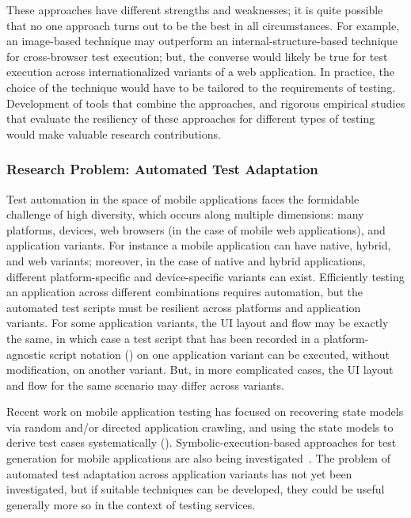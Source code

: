 These approaches have different strengths and weaknesses; it is quite possible
that no one approach turns out to be the best in all circumstances. For example,
an image-based technique may outperform an internal-structure-based technique
for cross-browser test execution; but, the converse would likely be true for
test execution across internationalized variants of a web application. In
practice, the choice of the technique would have to be tailored to the
requirements of testing.  Development of tools that combine the approaches, and
rigorous empirical studies that evaluate the resiliency of these approaches for
different types of testing would make valuable research contributions.


\subsubsection*{Research Problem: Automated Test Adaptation}

Test automation in the space of mobile applications faces the form\-idable
challenge of high diversity, which occurs along multiple dimensions: many
platforms, devices, web browsers (in the case of mobile web applications), and
application variants. For instance a mobile application can have native, hybrid,
and web variants; moreover, in the case of native and hybrid applications,
different platform-specific and device-specific variants can exist. Efficiently
testing an application across different combinations requires automation, but
the automated test scripts must be resilient across platforms and application
variants. For some application variants, the UI layout and flow may be exactly
the same, in which case a test script that has been recorded in a
platform-agnostic script notation (\eg \cite{PerfectoScriptOnce}) on one
application variant can be executed, without modification, on another variant.
But, in more complicated cases, the UI layout and flow for the same scenario may
differ across variants.

Recent work on mobile application testing has focused on recovering state models
via random and/or directed application crawling, and using the state models to
derive test cases systematically (\eg \cite{Amalfitano:2011, Amalfitano:2012,
  Choi:2013, Hu:2011, Joorabchi:2012, Yang:2013}). Symbolic-execution-based
approaches for test generation for mobile applications are also being
investigated~\cite{Anand:2012, Mirzaei:2012}. The problem of automated test
adaptation across application variants has not yet been investigated, but if
suitable techniques can be developed, they could be useful generally more so in
the context of testing services.

